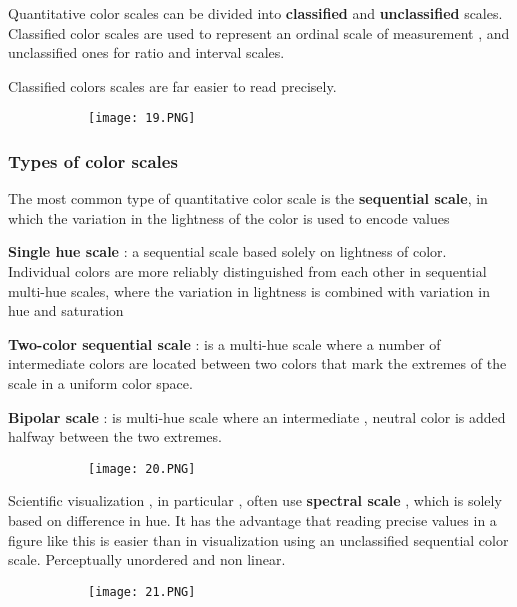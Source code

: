 \documentclass{article}
\begin{document}
Quantitative color scales can be divided into \textbf{classified} and \textbf{unclassified} scales.
Classified color scales are used to represent an ordinal scale of measurement , and unclassified ones for ratio and interval scales.

Classified colors scales are far easier to read precisely.

\begin{figure}[ht!]
  \centering
  \begin{subfigure}[b]{0.7\linewidth}
    \texttt{[image: 19.PNG]}
  \end{subfigure}
\end{figure}

\subsubsection{Types of color scales}

The most common type of quantitative color scale is the \textbf{sequential scale}, in which the variation in the lightness of the color is used to encode values

\textbf{Single hue scale} : a sequential scale based solely on lightness of color. Individual colors are more reliably distinguished from each other in sequential multi-hue scales, where the variation in lightness is combined with variation in hue and saturation

\textbf{Two-color sequential scale} : is a multi-hue scale where a number of intermediate colors are located between two colors that mark the extremes of the scale in a uniform color space.

\textbf{Bipolar scale} : is multi-hue scale where an intermediate , neutral color is added halfway between the two extremes.

\begin{figure}[ht!]
  \centering
  \begin{subfigure}[b]{0.7\linewidth}
    \texttt{[image: 20.PNG]}
  \end{subfigure}
\end{figure}

\vspace{20mm}

Scientific visualization , in particular , often use \textbf{spectral scale} , which is solely based on difference in hue. It has the advantage that reading precise values in a figure like this is easier than in visualization using an unclassified sequential color scale.
Perceptually unordered and non linear.

\begin{figure}[ht!]
  \centering
  \begin{subfigure}[b]{0.7\linewidth}
    \texttt{[image: 21.PNG]}
  \end{subfigure}
\end{figure}
\end{document}
